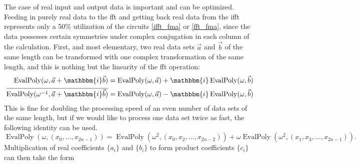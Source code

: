 \documentclass[12 pt]{amsart}
\newcommand{\ii}[0] {\mathbbm{i}}
\begin{document}
The case of real input and output data is important and can be
optimized. Feeding in purely real data to the fft and getting back real data
from the ifft represents only a 50\% utilization of the circuits 
\eqref{ifft_fma} or \eqref{fft_fma}, since the data possesses certain 
symmetries under complex conjugation in each column of the calculation.
First, and most elementary, two real data sets $\vec{a}$ and $\vec{b}$ of the
same length can be transformed with one complex transformation of the same
length, and this is nothing but the linearity of the fft operation:
\begin{align*}
\operatorname{EvalPoly}(\omega, \vec{a} + \ii \vec{b}) = 
\operatorname{EvalPoly}(\omega,\vec{a}) + \ii 
\operatorname{EvalPoly}(\omega,\vec{b})\\
\overline{\operatorname{EvalPoly}(\omega^{-1}, \vec{a} + \ii \vec{b})} = 
\operatorname{EvalPoly}(\omega,\vec{a}) - \ii 
\operatorname{EvalPoly}(\omega,\vec{b})
\end{align*}
This is fine for doubling the processing speed of an even number of data sets 
of the same length, but if we would like to process one data set twice as fast,
the following identity can be used.
\begin{equation*}
\operatorname{EvalPoly}(\omega, (x_0,\dots,x_{2n-1})) = \operatorname{EvalPoly}(\omega^2, (x_0, x_2,\dots,x_{2n-2})) + \omega \operatorname{EvalPoly}(\omega^2, (x_1, x_3,\dots,x_{2n-1}))\text{.}
\end{equation*}
Multiplication of real coefficients $\{a_i\}$ and $\{b_i\}$ to
form product coefficients $\{c_i\}$ can then take the form
\end{document}
